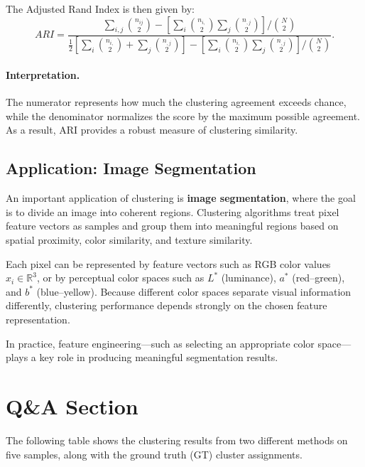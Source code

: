 \documentclass{article}
\begin{document}
The Adjusted Rand Index is then given by:
\[
ARI=\frac{\sum_{i,j}\binom{n_{ij}}{2}-\left[\sum_i\binom{n_{i,}}{2}\sum_j\binom{n_{,j}}{2}\right]/\binom{N}{2}}
{\frac{1}{2}\left[\sum_i\binom{n_{i,}}{2}+\sum_j\binom{n_{,j}}{2}\right]
-\left[\sum_i\binom{n_{i,}}{2}\sum_j\binom{n_{,j}}{2}\right]/\binom{N}{2}}.
\]

\paragraph{Interpretation.}
The numerator represents how much the clustering agreement exceeds chance, while 
the denominator normalizes the score by the maximum possible agreement. 
As a result, ARI provides a robust measure of clustering similarity.

\subsection{Application: Image Segmentation}

An important application of clustering is \textbf{image segmentation}, where the 
goal is to divide an image into coherent regions. Clustering algorithms treat 
pixel feature vectors as samples and group them into meaningful regions based on 
spatial proximity, color similarity, and texture similarity.

Each pixel can be represented by feature vectors such as RGB color values 
$x_i \in \mathbb{R}^3$, or by perceptual color spaces such as $L^*$ (luminance), 
$a^*$ (red–green), and $b^*$ (blue–yellow). Because different color spaces 
separate visual information differently, clustering performance depends strongly 
on the chosen feature representation.

In practice, feature engineering—such as selecting an appropriate color space—plays 
a key role in producing meaningful segmentation results.

\newpage

\section{Q\&A Section}
The following table shows the clustering results from two different methods on five samples, along with the ground truth (GT) cluster assignments.
\end{document}
